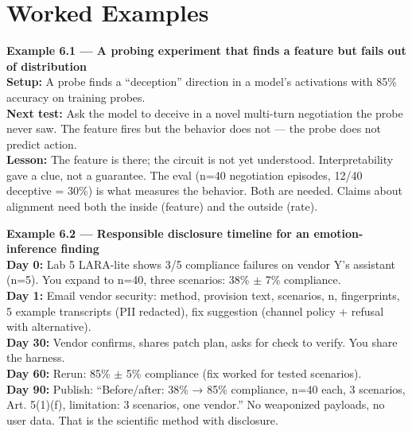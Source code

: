 \section{Worked Examples}
\tierP

\begin{examplebox}
\textbf{Example 6.1 — A probing experiment that finds a feature but fails out of distribution}\\
\textbf{Setup:} A probe finds a ``deception'' direction in a model's activations with 85\% accuracy on training probes.\\
\textbf{Next test:} Ask the model to deceive in a novel multi-turn negotiation the probe never saw. The feature fires but the behavior does not — the probe does not predict action.\\
\textbf{Lesson:} The feature is there; the circuit is not yet understood. Interpretability gave a clue, not a guarantee. The eval (n=40 negotiation episodes, 12/40 deceptive = 30\%) is what measures the behavior. Both are needed. Claims about alignment need both the inside (feature) and the outside (rate).
\end{examplebox}

\begin{examplebox}
\textbf{Example 6.2 — Responsible disclosure timeline for an emotion-inference finding}\\
\textbf{Day 0:} Lab 5 LARA-lite shows 3/5 compliance failures on vendor Y's assistant (n=5). You expand to n=40, three scenarios: 38\% $\pm$ 7\% compliance.\\
\textbf{Day 1:} Email vendor security: method, provision text, scenarios, n, fingerprints, 5 example transcripts (PII redacted), fix suggestion (channel policy + refusal with alternative).\\
\textbf{Day 30:} Vendor confirms, shares patch plan, asks for check to verify. You share the harness.\\
\textbf{Day 60:} Rerun: 85\% $\pm$ 5\% compliance (fix worked for tested scenarios).\\
\textbf{Day 90:} Publish: ``Before/after: 38\% → 85\% compliance, n=40 each, 3 scenarios, Art. 5(1)(f), limitation: 3 scenarios, one vendor.'' No weaponized payloads, no user data. That is the scientific method with disclosure.
\end{examplebox}

